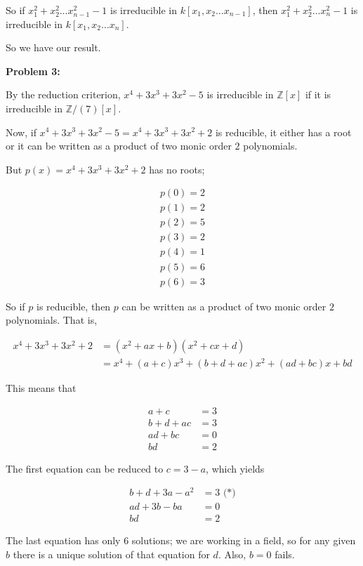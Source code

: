 \documentclass[a4paper,12pt]{article}
\newcommand{\tab}{\hspace{4mm}} %
\newcommand{\shunt}{\vspace{20mm}}
\newcommand{\Z}{\mathbb{Z}}
\begin{document}
\tab So if $x_1^2 + x_2^2 \ldots x_{n-1}^2 -1$ is irreducible in $k[x_1, x_2 \ldots x_{n-1}]$, then $x_1^2 + x_2^2 \ldots x_{n}^2 -1$ is irreducible in $k[x_1, x_2 \ldots x_{n}]$.

So we have our result. 


\shunt

{\bf Problem 3:} %

By the reduction criterion, $x^4 + 3x^3 + 3x^2 -5$ is irreducible in $\Z[x]$ if it is irreducible in $\Z/(7)[x]$.

Now, if $x^4 + 3x^3 + 3x^2 -5 = x^4 + 3x^3 + 3x^2 +2$ is reducible, it either has a root or it can be written as a product of two monic order $2$ polynomials.

But $p(x) = x^4 + 3x^3 + 3x^2 +2$ has no roots; 

\begin{align*}
p(0)=2\\
p(1)=2\\
p(2)=5\\
p(3)=2\\
p(4)=1\\
p(5)=6\\
p(6)=3
\end{align*}

So if $p$ is reducible, then $p$ can be written as a product of two monic order $2$ polynomials. That is, 

\begin{align*}
x^4 + 3x^3 + 3x^2 +2 &= (x^2+ax+b)(x^2+cx+d)\\
&=x^4+(a+c)x^3+(b+d+ac)x^2+(ad+bc)x+bd
\end{align*}

This means that

\begin{align*}
a+c&=3\\
b+d+ac&=3\\
ad+bc&=0\\
bd&=2
\end{align*}

The first equation can be reduced to $c=3-a$, which yields

\begin{align*}
b+d+3a-a^2&=3 \text{ (*)}\\
ad+3b-ba&=0\\
bd&=2
\end{align*}

The last equation has only $6$ solutions; we are working in a field, so for any given $b$ there is a unique solution of that equation for $d$. Also, $b=0$ fails.
\end{document}
